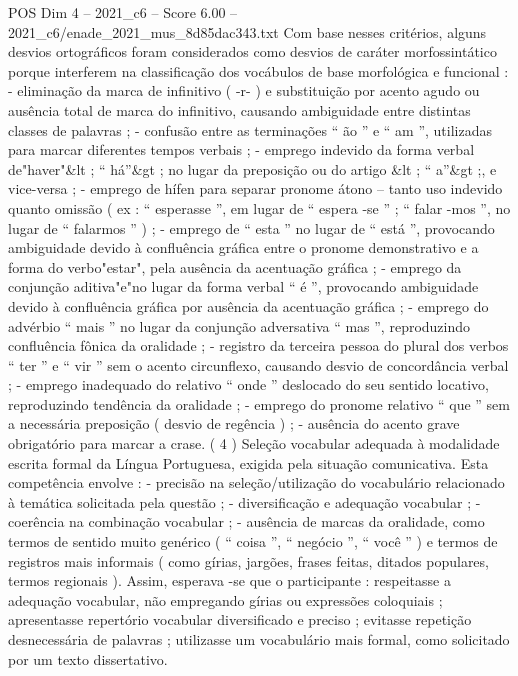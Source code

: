 \begin{textsample}{POS Dim 4 – 2021\_c6 – Score 6.00 – 2021\_c6/enade\_2021\_mus\_8d85dac343.txt}
Com base nesses critérios, alguns desvios ortográficos foram considerados como desvios de caráter morfossintático porque interferem na classificação dos vocábulos de base morfológica e funcional : - eliminação da marca de infinitivo ( -r- ) e substituição por acento agudo ou ausência total de marca do infinitivo, causando ambiguidade entre distintas classes de palavras ; - confusão entre as terminações “ ão ” e “ am ”, utilizadas para marcar diferentes tempos verbais ; - emprego indevido da forma verbal de"haver"\&lt ; “ há”\&gt ; no lugar da preposição ou do artigo \&lt ; “ a”\&gt ;, e vice-versa ; - emprego de hífen para separar pronome átono – tanto uso indevido quanto omissão ( ex : “ esperasse ”, em lugar de “ espera -se ” ; “ falar -mos ”, no lugar de “ falarmos ” ) ; - emprego de “ esta ” no lugar de “ está ”, provocando ambiguidade devido à confluência gráfica entre o pronome demonstrativo e a forma do verbo"estar", pela ausência da acentuação gráfica ; - emprego da conjunção aditiva"e"no lugar da forma verbal “ é ”, provocando ambiguidade devido à confluência gráfica por ausência da acentuação gráfica ; - emprego do advérbio “ mais ” no lugar da conjunção adversativa “ mas ”, reproduzindo confluência fônica da oralidade ; - registro da terceira pessoa do plural dos verbos “ ter ” e “ vir ” sem o acento circunflexo, causando desvio de concordância verbal ; - emprego inadequado do relativo “ onde ” deslocado do seu sentido locativo, reproduzindo tendência da oralidade ; - emprego do pronome relativo “ que ” sem a necessária preposição ( desvio de regência ) ; - ausência do acento grave obrigatório para marcar a crase. ( 4 ) Seleção vocabular adequada à modalidade escrita formal da Língua Portuguesa, exigida pela situação comunicativa.
Esta competência envolve : - precisão na seleção/utilização do vocabulário relacionado à temática solicitada pela questão ; - diversificação e adequação vocabular ; - coerência na combinação vocabular ; - ausência de marcas da oralidade, como termos de sentido muito genérico ( “ coisa ”, “ negócio ”, “ você ” ) e termos de registros mais informais ( como gírias, jargões, frases feitas, ditados populares, termos regionais ).
Assim, esperava -se que o participante : respeitasse a adequação vocabular, não empregando gírias ou expressões coloquiais ; apresentasse repertório vocabular diversificado e preciso ; evitasse repetição desnecessária de palavras ; utilizasse um vocabulário mais formal, como solicitado por um texto dissertativo.

\end{textsample}

